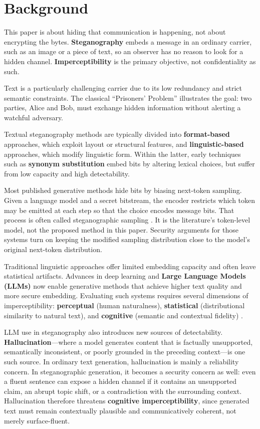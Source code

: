 \section{Background}
\label{sec:background}

This paper is about hiding that communication is happening, not about encrypting the bytes.
\textbf{Steganography} embeds a message in an ordinary carrier, such as an image or a piece of text, so an observer has no reason to look for a hidden channel.
\textbf{Imperceptibility} is the primary objective, not confidentiality as such.

Text is a particularly challenging carrier due to its low redundancy and strict semantic constraints. The classical ``Prisoners' Problem'' \cite{simmons1984prisoners} illustrates the goal: two parties, Alice and Bob, must exchange hidden information without alerting a watchful adversary.

Textual steganography methods are typically divided into \textbf{format-based} approaches, which exploit layout or structural features, and \textbf{linguistic-based} approaches, which modify linguistic form. Within the latter, early techniques such as \textbf{synonym substitution} embed bits by altering lexical choices, but suffer from low capacity and high detectability.

Most published generative methods hide bits by biasing next-token sampling.
Given a language model and a secret bitstream, the encoder restricts which token may be emitted at each step so that the choice encodes message bits.
That process is often called steganographic sampling \cite{zhang2021provably}.
It is the literature's token-level model, not the proposed method in this paper.
Security arguments for those systems turn on keeping the modified sampling distribution close to the model's original next-token distribution.

Traditional linguistic approaches offer limited embedding capacity and often leave statistical artifacts. Advances in deep learning and \textbf{Large Language Models (LLMs)} now enable generative methods that achieve higher text quality and more secure embedding. Evaluating such systems requires several dimensions of imperceptibility: \textbf{perceptual} (human naturalness), \textbf{statistical} (distributional similarity to natural text), and \textbf{cognitive} (semantic and contextual fidelity) \cite{ding2023context}.

LLM use in steganography also introduces new sources of detectability. \textbf{Hallucination}---where a model generates content that is factually unsupported, semantically inconsistent, or poorly grounded in the preceding context---is one such source. In ordinary text generation, hallucination is mainly a reliability concern. In steganographic generation, it becomes a security concern as well: even a fluent sentence can expose a hidden channel if it contains an unsupported claim, an abrupt topic shift, or a contradiction with the surrounding context. Hallucination therefore threatens \textbf{cognitive imperceptibility}, since generated text must remain contextually plausible and communicatively coherent, not merely surface-fluent.

